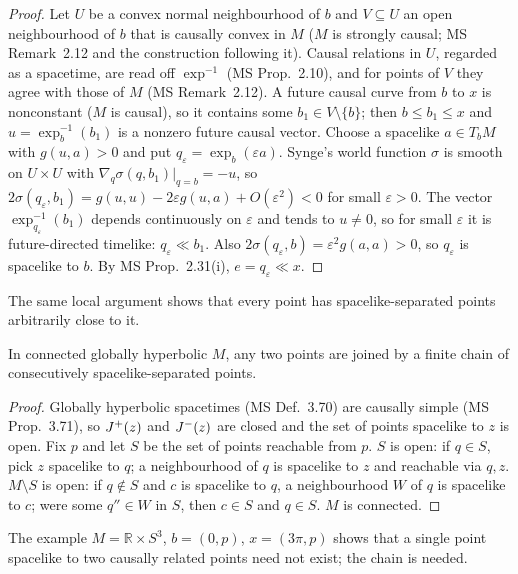 \begin{proof}
Let $U$ be a convex normal neighbourhood of $b$ and $V\subseteq U$ an open
neighbourhood of $b$ that is causally convex in $M$ ($M$ is strongly causal;
MS Remark~2.12 and the construction following it). Causal relations in $U$,
regarded as a spacetime, are read off $\exp^{-1}$ (MS Prop.~2.10), and for
points of $V$ they agree with those of $M$ (MS Remark~2.12). A future causal
curve from $b$ to $x$ is nonconstant ($M$ is causal), so it contains some
$b_1\in V\setminus\{b\}$; then $b\le b_1\le x$ and $u=\exp_b^{-1}(b_1)$ is
a nonzero future causal vector. Choose a spacelike $a\in T_bM$ with
$g(u,a)>0$ and put $q_\varepsilon=\exp_b(\varepsilon a)$. Synge's world
function $\sigma$ is smooth on $U\times U$ with $\nabla_q\sigma(q,b_1)|_{q=b}=-u$,
so $2\sigma(q_\varepsilon,b_1)=g(u,u)-2\varepsilon g(u,a)+O(\varepsilon^2)<0$ for
small $\varepsilon>0$. The vector $\exp^{-1}_{q_\varepsilon}(b_1)$ depends
continuously on $\varepsilon$ and tends to $u\neq0$, so for small $\varepsilon$
it is future-directed timelike: $q_\varepsilon\ll b_1$. Also
$2\sigma(q_\varepsilon,b)=\varepsilon^2g(a,a)>0$, so $q_\varepsilon$ is spacelike
to $b$. By MS Prop.~2.31(i), $e=q_\varepsilon\ll x$.
\end{proof}

The same local argument shows that every point has spacelike-separated
points arbitrarily close to it.

\begin{lemma}\label{lem:E}
In connected globally hyperbolic $M$, any two points are joined by a finite
chain of consecutively spacelike-separated points.
\end{lemma}

\begin{proof}
Globally hyperbolic spacetimes (MS Def.~3.70) are causally simple (MS
Prop.~3.71), so $J^{+}(z)$ and $J^{-}(z)$ are closed and the set of points
spacelike to $z$ is open. Fix $p$ and let $S$ be the set of points reachable
from $p$. $S$ is open: if $q\in S$, pick $z$ spacelike to $q$; a
neighbourhood of $q$ is spacelike to $z$ and reachable via $q,z$.
$M\setminus S$ is open: if $q\notin S$ and $c$ is spacelike to $q$, a
neighbourhood $W$ of $q$ is spacelike to $c$; were some $q''\in W$ in $S$, then
$c\in S$ and $q\in S$. $M$ is connected.
\end{proof}

The example $M=\mathbb R\times S^3$, $b=(0,p)$, $x=(3\pi,p)$ shows that a single
point spacelike to two causally related points need not exist; the chain is
needed.

